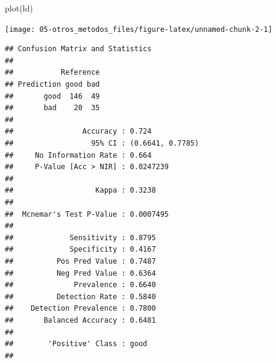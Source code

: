 \documentclass[
]{book}
\newenvironment{Shaded}{\begin{snugshade}}{\end{snugshade}}
\newcommand{\AttributeTok}[1]{\textcolor[rgb]{0.77,0.63,0.00}{#1}}
\newcommand{\FunctionTok}[1]{\textcolor[rgb]{0.00,0.00,0.00}{#1}}
\newcommand{\NormalTok}[1]{#1}
\newcommand{\OtherTok}[1]{\textcolor[rgb]{0.56,0.35,0.01}{#1}}
\newcommand{\SpecialCharTok}[1]{\textcolor[rgb]{0.00,0.00,0.00}{#1}}
\theoremstyle{break}
\theoremstyle{definition}
\theoremstyle{definition}
\theoremstyle{definition}
\theoremstyle{definition}
\theoremstyle{remark}
\begin{document}
\begin{Shaded}
\begin{Highlighting}[]
\FunctionTok{plot}\NormalTok{(ld)}
\end{Highlighting}
\end{Shaded}

\begin{center}\texttt{[image: 05-otros\_metodos\_files/figure-latex/unnamed-chunk-2-1]} \end{center}

\begin{Shaded}
\end{Shaded}

\begin{verbatim}
## Confusion Matrix and Statistics
## 
##           Reference
## Prediction good bad
##       good  146  49
##       bad    20  35
##                                           
##                Accuracy : 0.724           
##                  95% CI : (0.6641, 0.7785)
##     No Information Rate : 0.664           
##     P-Value [Acc > NIR] : 0.0247239       
##                                           
##                   Kappa : 0.3238          
##                                           
##  Mcnemar's Test P-Value : 0.0007495       
##                                           
##             Sensitivity : 0.8795          
##             Specificity : 0.4167          
##          Pos Pred Value : 0.7487          
##          Neg Pred Value : 0.6364          
##              Prevalence : 0.6640          
##          Detection Rate : 0.5840          
##    Detection Prevalence : 0.7800          
##       Balanced Accuracy : 0.6481          
##                                           
##        'Positive' Class : good            
## 
\end{verbatim}

\begin{Shaded}
\end{Shaded}
\end{document}
